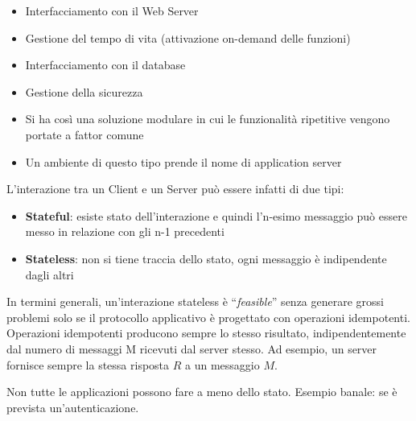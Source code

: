     \begin{itemize}
        
        \item Interfacciamento con il Web Server
        
        \item Gestione del tempo di vita (attivazione on-demand delle funzioni)
        
        \item Interfacciamento con il database
        
        \item Gestione della sicurezza
        
        \item Si ha così una soluzione modulare in cui le funzionalità ripetitive vengono
        portate a fattor comune
        
        \item Un ambiente di questo tipo prende il nome di application server
    \end{itemize}    

    L’interazione tra un Client e un Server può essere infatti di due tipi:
    
    \begin{itemize}
        \item \textbf{Stateful}: esiste stato dell’interazione e quindi l’n-esimo
        messaggio può essere messo in relazione con gli n-1
        precedenti
        
        \item \textbf{Stateless}: non si tiene traccia dello stato, ogni messaggio è
        indipendente dagli altri
    \end{itemize}
    
    In termini generali, un’interazione stateless è “\textit{feasible}” senza generare grossi problemi solo se il protocollo applicativo è progettato con operazioni idempotenti. Operazioni idempotenti producono sempre lo stesso risultato, indipendentemente dal numero di messaggi M ricevuti dal server stesso. Ad esempio, un server fornisce sempre la stessa risposta \(R\) a un messaggio \(M\).
    
    \vspace{3mm}
    
    Non tutte le applicazioni possono fare a meno dello stato. Esempio banale: se è prevista un’autenticazione.
    
    \vspace{3mm}
    

